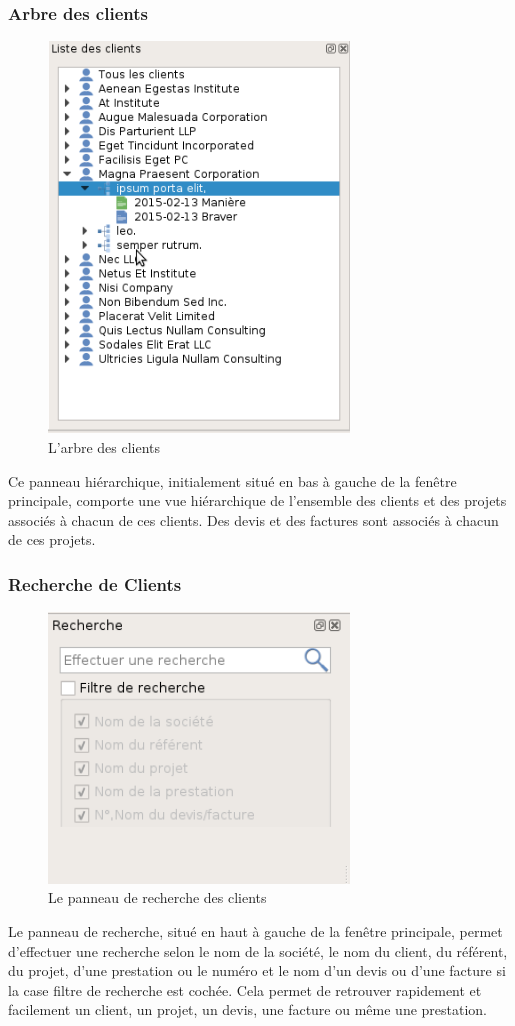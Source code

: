 \subsubsection{Arbre des clients}
\begin{figure}[H]
	\centering
	\includegraphics[width=8cm]{screens/dockHierarchique.png}
	\caption{L'arbre des clients}
	\label{fig:customers_tree}
\end{figure}
Ce panneau hiérarchique, initialement situé en bas à gauche de la fenêtre principale, comporte une
vue hiérarchique de l’ensemble des clients et des projets associés à chacun de ces clients. Des devis
et des factures sont associés à chacun de ces projets.

\subsubsection{Recherche de Clients}
\begin{figure}[H]
	\centering
	\includegraphics[width=8cm]{screens/dockRecherche.png}
	\caption{Le panneau de recherche des clients}
	\label{fig:customers_search}
\end{figure}
Le panneau de recherche, situé en haut à gauche de la fenêtre principale, permet d’effectuer une recherche selon le nom de
la société, le nom du client, du référent, du projet, d’une prestation ou le numéro et le nom d’un
devis ou d’une facture si la case filtre de recherche est cochée. Cela permet de retrouver rapidement
et facilement un client, un projet, un devis, une facture ou même une prestation.

